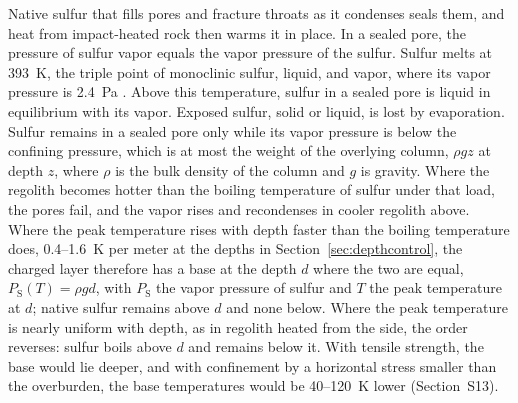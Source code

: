 \documentclass[article,review]{planetary}
\begin{document}
Native sulfur that fills pores and fracture throats as it condenses seals them, and heat from impact-heated rock then warms it in place. In a sealed pore, the pressure of sulfur vapor equals the vapor pressure of the sulfur. Sulfur melts at 393~K, the triple point of monoclinic sulfur, liquid, and vapor, where its vapor pressure is 2.4~Pa \parencite{steudel2003}. Above this temperature, sulfur in a sealed pore is liquid in equilibrium with its vapor. Exposed sulfur, solid or liquid, is lost by evaporation. Sulfur remains in a sealed pore only while its vapor pressure is below the confining pressure, which is at most the weight of the overlying column, $\rho g z$ at depth $z$, where $\rho$ is the bulk density of the column and $g$ is gravity. Where the regolith becomes hotter than the boiling temperature of sulfur under that load, the pores fail, and the vapor rises and recondenses in cooler regolith above. Where the peak temperature rises with depth faster than the boiling temperature does, 0.4--1.6~K per meter at the depths in Section~\ref{sec:depthcontrol}, the charged layer therefore has a base at the depth $d$ where the two are equal, $P_{\mathrm{S}}(T) = \rho g d$, with $P_{\mathrm{S}}$ the vapor pressure of sulfur and $T$ the peak temperature at $d$; native sulfur remains above $d$ and none below. Where the peak temperature is nearly uniform with depth, as in regolith heated from the side, the order reverses: sulfur boils above $d$ and remains below it. With tensile strength, the base would lie deeper, and with confinement by a horizontal stress smaller than the overburden, the base temperatures would be 40--120~K lower (Section~S13).
\end{document}
